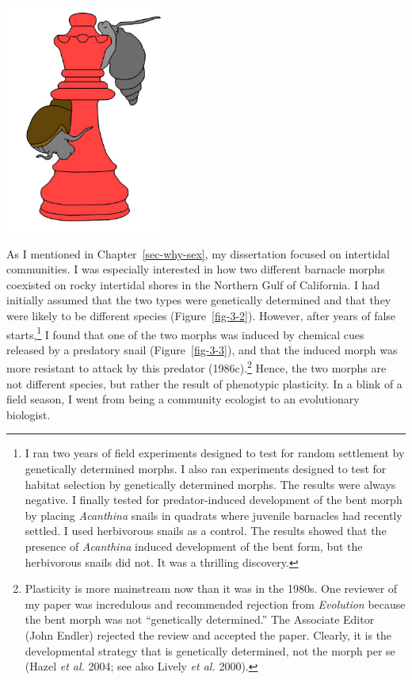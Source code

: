 \documentclass[
  letterpaper,
]{book}
\begin{document}
\begin{center}
\includegraphics[width=0.4\textwidth,height=\textheight]{images/fig3-1.jpeg}
\end{center}

As I mentioned in Chapter~\ref{sec-why-sex}, my dissertation focused on
intertidal communities. I was especially interested in how two different
barnacle morphs coexisted on rocky intertidal shores in the Northern
Gulf of California. I had initially assumed that the two types were
genetically determined and that they were likely to be different species
(Figure~\ref{fig-3-2}). However, after years of false starts,\footnote{I
  ran two years of field experiments designed to test for random
  settlement by genetically determined morphs. I also ran experiments
  designed to test for habitat selection by genetically determined
  morphs. The results were always negative. I finally tested for
  predator-induced development of the bent morph by placing
  \emph{Acanthina} snails in quadrats where juvenile barnacles had
  recently settled. I used herbivorous snails as a control. The results
  showed that the presence of \emph{Acanthina} induced development of
  the bent form, but the herbivorous snails did not. It was a thrilling
  discovery.} I found that one of the two morphs was induced by chemical
cues released by a predatory snail (Figure~\ref{fig-3-3}), and that the
induced morph was more resistant to attack by this predator
(1986c).\footnote{Plasticity is more mainstream now than it was in the
  1980s. One reviewer of my paper was incredulous and recommended
  rejection from \emph{Evolution} because the bent morph was not
  ``genetically determined.'' The Associate Editor (John Endler)
  rejected the review and accepted the paper. Clearly, it is the
  developmental strategy that is genetically determined, not the morph
  per se (Hazel \emph{et al.} 2004; see also Lively \emph{et al.} 2000).}
Hence, the two morphs are not different species, but rather the result
of phenotypic plasticity. In a blink of a field season, I went from
being a community ecologist to an evolutionary biologist.
\end{document}
